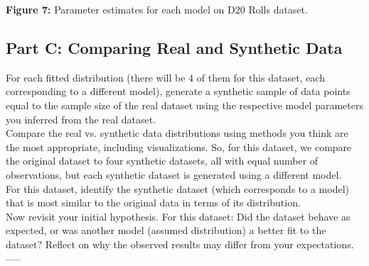 \begin{center}
\textbf{Figure 7:} Parameter estimates for each model on D20 Rolls dataset.
\end{center}
\newpage

\subsection{Part C: Comparing Real and Synthetic Data}

For each fitted distribution (there will be 4 of them for this dataset, each corresponding to a different model), generate a synthetic sample of data points equal to the sample size of the real dataset using the respective model parameters you inferred from the real dataset.\\

Compare the real vs. synthetic data distributions using methods you think are the most appropriate, including visualizations. So, for this dataset, we compare the original dataset to four synthetic datasets, all with equal number of observations, but each synthetic dataset is generated using a different model.\\

For this dataset, identify the synthetic dataset (which corresponds to a model) that is most similar to the original data in terms of its distribution.\\

Now revisit your initial hypothesis. For this dataset: Did the dataset behave as expected, or was another model (assumed distribution) a better fit to the dataset? Reflect on why the observed results may differ from your expectations.\\
-----\\
